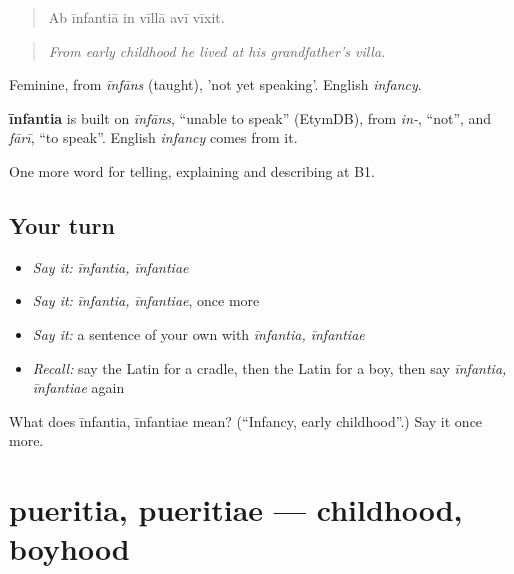 \begin{quote}
Ab īnfantiā in vīllā avī vīxit.
\end{quote}

\begin{quote}
\emph{From early childhood he lived at his grandfather's villa.}
\end{quote}

Feminine, from \emph{īnfāns} (taught), 'not yet speaking'. English \emph{infancy}.

\begin{cousinweb}
\textbf{īnfantia} is built on \emph{īnfāns}, \textquotedblleft{}unable to speak\textquotedblright{} (EtymDB), from \emph{in-}, \textquotedblleft{}not\textquotedblright{}, and \emph{fārī}, \textquotedblleft{}to speak\textquotedblright{}. English \emph{infancy} comes from it.
\end{cousinweb}

\begin{grammarlens}[title={What you've built}]
One more word for telling, explaining and describing at B1.
\end{grammarlens}

\subsection*{Your turn}
\begin{itemize}
\raggedright
  \item \emph{Say it:} \emph{īnfantia, īnfantiae}
  \item \emph{Say it:} \emph{īnfantia, īnfantiae}, once more
  \item \emph{Say it:} a sentence of your own with \emph{īnfantia, īnfantiae}
  \item \emph{Recall:} say the Latin for a cradle, then the Latin for a boy, then say \emph{īnfantia, īnfantiae} again
\end{itemize}

\begin{tcolorbox}[breakable,colback=teal!4,colframe=teal!35!black,title={Before you move on}]
What does īnfantia, īnfantiae mean? (\textquotedblleft{}Infancy, early childhood\textquotedblright{}.) Say it once more.
\end{tcolorbox}
\section[pueritia, pueritiae]{pueritia, pueritiae — childhood, boyhood}

\label{lesson:LA-C324-pueritia}



